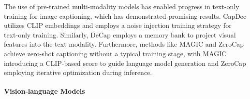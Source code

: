 The use of pre-trained multi-modality models has enabled progress in text-only training for image captioning, which has demonstrated promising results. CapDec \cite{CapDec} utilizes CLIP embeddings and employs a noise injection training strategy for text-only training. Similarly, DeCap \cite{DeCap} employs a memory bank to project visual features into the text modality. Furthermore, methods like MAGIC \cite{MAGIC} and ZeroCap \cite{ZeroCap} achieve zero-shot captioning without a typical training stage, with MAGIC introducing a CLIP-based score to guide language model generation and ZeroCap employing iterative optimization during inference.


\paragraph{Vision-language Models}

